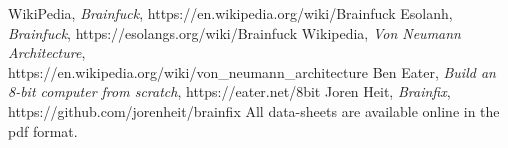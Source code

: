 \begin{thebibliography}{99} \label{resources}
 WikiPedia, \emph{Brainfuck}, https://en.wikipedia.org/wiki/Brainfuck
 Esolanh, \emph{Brainfuck}, https://esolangs.org/wiki/Brainfuck
 Wikipedia, \emph{Von Neumann Architecture},\\https://en.wikipedia.org/wiki/von\_neumann\_architecture
 Ben Eater, \emph{Build an 8-bit computer from scratch}, https://eater.net/8bit
 Joren Heit, \emph{Brainfix}, https://github.com/jorenheit/brainfix
 All data-sheets are available online in the pdf format.
\end{thebibliography}

